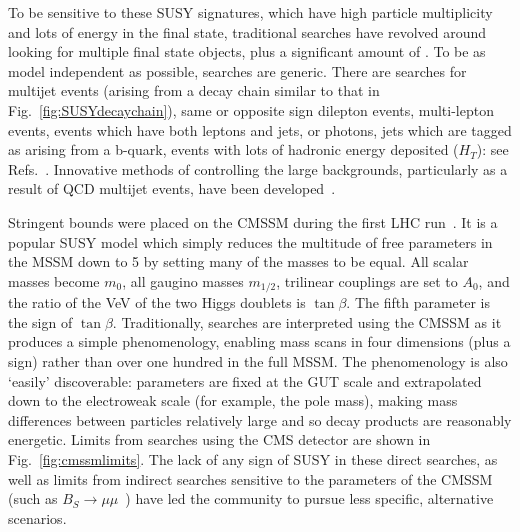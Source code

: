 To be sensitive to these \ac{SUSY} signatures, which have high particle multiplicity and lots of energy in the final state, traditional searches have revolved around looking for multiple final state objects, plus a significant amount of \MET.
To be as model independent as possible, searches are generic.
There are searches for multijet events (arising from a decay chain similar to that in Fig.~\ref{fig:SUSYdecaychain}), 
same or opposite sign dilepton events, multi-lepton events, 
events which have both leptons and jets, or photons,
jets which are tagged as arising from a b-quark, 
events with lots of hadronic energy deposited ($H_{T}$): see Refs.~\cite{CMSdilepbjets,CMSmultijet1,CMSmultijet2,CMSsinlepJets,CMSmultilep,CMSsinglelep,CMSdiphotonH,CMSHZbosons,CMSleptonsWZH}.
Innovative methods of controlling the large backgrounds, particularly as a result of \ac{QCD} multijet events, have been developed~\cite{CMSrazor7TeV,CMSalphaT,CMSmt2}.

Stringent bounds were placed on the \ac{CMSSM} during the first \ac{LHC} run~\cite{constrainedCMSSM,finetuningcmssm}. 
It is a popular \ac{SUSY} model which simply reduces the multitude of free parameters in the \ac{MSSM} down to 5 by setting many of the masses to be equal. 
All scalar masses become $m_{0}$, all gaugino masses $m_{1/2}$, trilinear couplings are set to $A_{0}$, and the ratio of the \ac{VeV} of the two Higgs doublets is $\tan{\beta}$. 
The fifth parameter is the sign of $\tan{\beta}$.
Traditionally, searches are interpreted using the \ac{CMSSM} as it produces a simple phenomenology, enabling mass scans in four dimensions (plus a sign) rather than over one hundred in the full \ac{MSSM}. 
The phenomenology is also `easily' discoverable: parameters are fixed at the \ac{GUT} scale and extrapolated down to the electroweak scale (for example, the \Z pole mass), making mass differences between particles relatively large and so decay products are reasonably energetic. 
Limits from searches using the CMS detector are shown in Fig.~\ref{fig:cmssmlimits}.
The lack of any sign of \ac{SUSY} in these direct searches, as well as limits from indirect searches sensitive to the parameters of the \ac{CMSSM} (such as $B_{S}\rightarrow \mu\mu$~\cite{BSmumuCombo}) have led the community to pursue less specific, alternative scenarios.


